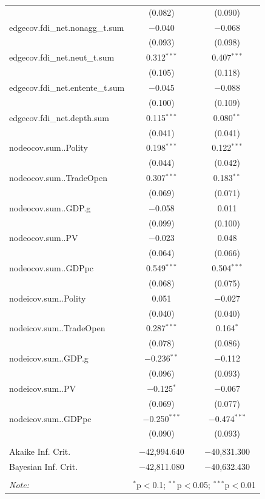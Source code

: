 \documentclass{article}
\begin{document}
\begin{table}[!htbp]
\begin{tabular}{@{\extracolsep{2pt}}lcc}
  & (0.082) & (0.090) \\ 
  edgecov.fdi\_net.nonagg\_t.sum & $-$0.040 & $-$0.068 \\ 
  & (0.093) & (0.098) \\ 
  edgecov.fdi\_net.neut\_t.sum & 0.312$^{***}$ & 0.407$^{***}$ \\ 
  & (0.105) & (0.118) \\ 
  edgecov.fdi\_net.entente\_t.sum & $-$0.045 & $-$0.088 \\ 
  & (0.100) & (0.109) \\ 
  edgecov.fdi\_net.depth.sum & 0.115$^{***}$ & 0.080$^{**}$ \\ 
  & (0.041) & (0.041) \\ 
  nodeocov.sum..Polity & 0.198$^{***}$ & 0.122$^{***}$ \\ 
  & (0.044) & (0.042) \\ 
  nodeocov.sum..TradeOpen & 0.307$^{***}$ & 0.183$^{**}$ \\ 
  & (0.069) & (0.071) \\ 
  nodeocov.sum..GDP.g & $-$0.058 & 0.011 \\ 
  & (0.099) & (0.100) \\ 
  nodeocov.sum..PV & $-$0.023 & 0.048 \\ 
  & (0.064) & (0.066) \\ 
  nodeocov.sum..GDPpc & 0.549$^{***}$ & 0.504$^{***}$ \\ 
  & (0.068) & (0.075) \\ 
  nodeicov.sum..Polity & 0.051 & $-$0.027 \\ 
  & (0.040) & (0.040) \\ 
  nodeicov.sum..TradeOpen & 0.287$^{***}$ & 0.164$^{*}$ \\ 
  & (0.078) & (0.086) \\ 
  nodeicov.sum..GDP.g & $-$0.236$^{**}$ & $-$0.112 \\ 
  & (0.096) & (0.093) \\ 
  nodeicov.sum..PV & $-$0.125$^{*}$ & $-$0.067 \\ 
  & (0.069) & (0.077) \\ 
  nodeicov.sum..GDPpc & $-$0.250$^{***}$ & $-$0.474$^{***}$ \\ 
  & (0.090) & (0.093) \\ 
 \hline \\[-1.8ex] 
Akaike Inf. Crit. & $-$42,994.640 & $-$40,831.300 \\ 
Bayesian Inf. Crit. & $-$42,811.080 & $-$40,632.430 \\ 
\hline 
\hline \\[-1.8ex] 
\textit{Note:}  & \multicolumn{2}{r}{$^{*}$p$<$0.1; $^{**}$p$<$0.05; $^{***}$p$<$0.01} \\ 
\end{tabular} 
\end{table} 
\end{document}
